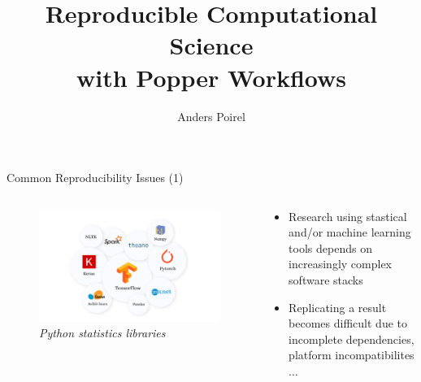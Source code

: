 \documentclass[10pt]{beamer}
\title{Reproducible Computational Science\\ with Popper Workflows}
\author{Anders Poirel}
\date{}
\institute{CROSS 2020 Research Symposium\\ University of California, Santa Cruz}
\begin{document}
\maketitle

\begin{frame}{Common Reproducibility Issues (1)}
    \begin{columns}
        \begin{column}{0.5\textwidth}  %
            \begin{center}
                \begin{figure}
                    \includegraphics[width=1.1\textwidth]{images/libraries.png}
                    \caption*{{\sl Python statistics libraries}}
                \end{figure}
            \end{center}
        \end{column}
        \begin{column}{0.5\textwidth}
            \begin{itemize}
                \item Research using stastical and/or machine learning tools
                depends on increasingly complex software stacks
                \item Replicating a result becomes difficult due to 
                incomplete dependencies, platform incompatibilites $\ldots$ 
            \end{itemize}
        \end{column}
    \end{columns}
\end{frame}
\end{document}
